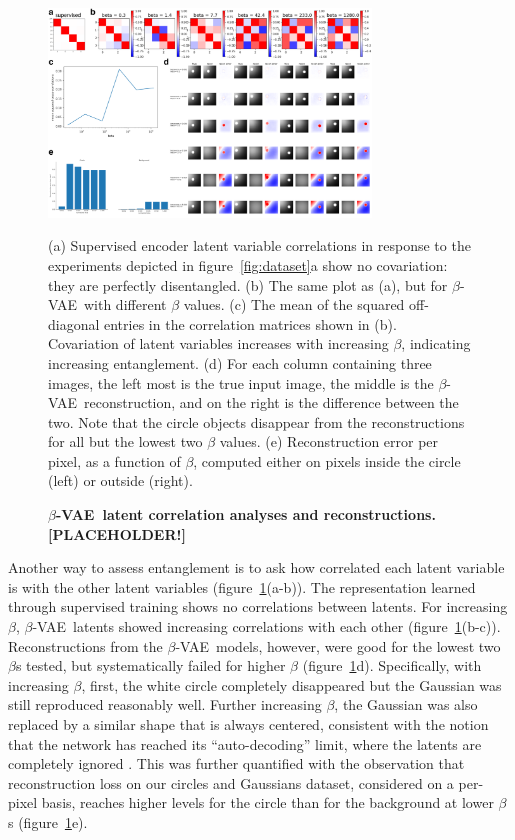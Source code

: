 \documentclass[10pt,letterpaper]{article}
\newcommand{\bvae}{$\beta$-VAE~}
\begin{document}
\begin{figure}[t!]
     \includegraphics[width=3.375in]{analyses.pdf}
  \caption{\textbf{\bvae latent correlation analyses and reconstructions. [PLACEHOLDER!]}}{(a) Supervised encoder latent variable correlations in response to the experiments depicted in figure~\ref{fig:dataset}a show no covariation: they are perfectly disentangled. (b) The same plot as (a), but for \bvae with different $\beta$ values. (c) The mean of the squared off-diagonal entries in the correlation matrices shown in (b). Covariation of latent variables increases with increasing $\beta$, indicating increasing entanglement. (d) For each column containing three images, the left most is the true input image, the middle is the \bvae reconstruction, and on the right is the difference between the two. Note that the circle objects disappear from the reconstructions for all but the lowest two $\beta$ values. (e) Reconstruction error per pixel, as a function of $\beta$, computed either on pixels inside the circle (left) or outside (right).}
  \label{fig:analyses}
\end{figure}

Another way to assess entanglement is to ask how correlated each latent variable is with the other latent variables (figure~\ref{fig:analyses}(a-b)). The representation learned through supervised training shows no correlations between latents. For increasing $\beta$, \bvae latents showed increasing correlations with each other (figure~\ref{fig:analyses}(b-c)). Reconstructions from the \bvae models, however, were good for the lowest two $\beta$s tested, but systematically failed for higher $\beta$ (figure~\ref{fig:analyses}d). Specifically, with increasing $\beta$, first, the white circle completely disappeared but the Gaussian was still reproduced reasonably well. Further increasing $\beta$, the Gaussian was also replaced by a similar shape that is always centered, consistent with the notion that the network has reached its ``auto-decoding'' limit, where the latents are completely ignored \cite{Alemi2017}. This was further quantified with the observation that reconstruction loss on our circles and Gaussians dataset, considered on a per-pixel basis, reaches higher levels for the circle than for the background at lower $\beta$s (figure~\ref{fig:analyses}e).
\end{document}
